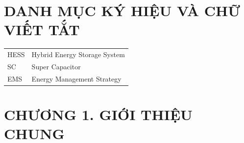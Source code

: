 \documentclass{thesis}
\begin{document}
\thispagestyle{empty}
    \cleardoublepage

\tableofcontents 
    \thispagestyle{empty}
        \newpage
            \thispagestyle{empty}
                \cleardoublepage

\section*{DANH MỤC KÝ HIỆU VÀ CHỮ VIẾT TẮT}
     {}

\begin{tabular}{ l l }
    \hspace{1cm} HESS & \hspace{4cm} Hybrid Energy Storage System \\  
    \hspace{1cm} SC & \hspace{4cm} Super Capacitor    \\
    \hspace{1cm} EMS  & \hspace{4cm} Energy Management Strategy 
\end{tabular}  
    \newpage

{\let\oldnumberline\numberline
    \renewcommand{\numberline}{Hình~\oldnumberline}
        \listoffigures}
\newpage

{\let\oldnumberline\numberline
    \renewcommand{\numberline}{Bảng~\oldnumberline}
        \listoftables}
\newpage


    \section*{CHƯƠNG 1. GIỚI THIỆU CHUNG} 

\setcounter{section}{1} 
    \setcounter{subsection}{0}
        \setcounter{figure}{0}
            \setcounter{table}{0}
\end{document}
